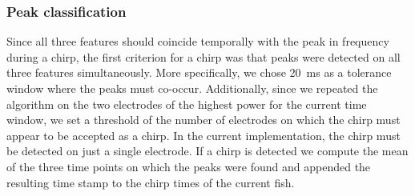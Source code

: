 \subsubsection{Peak classification}

Since all three features should coincide temporally with the peak in frequency during a chirp, the first criterion for a chirp was that peaks were detected on all three features simultaneously. More specifically, we chose \SI{20}{\milli\second} as a tolerance window where the peaks must co-occur. Additionally, since we repeated the algorithm on the two electrodes of the highest power for the current time window, we set a threshold of the number of electrodes on which the chirp must appear to be accepted as a chirp. In the current implementation, the chirp must be detected on just a single electrode. If a chirp is detected we compute the mean of the three time points on which the peaks were found and appended the resulting time stamp to the chirp times of the current fish.

